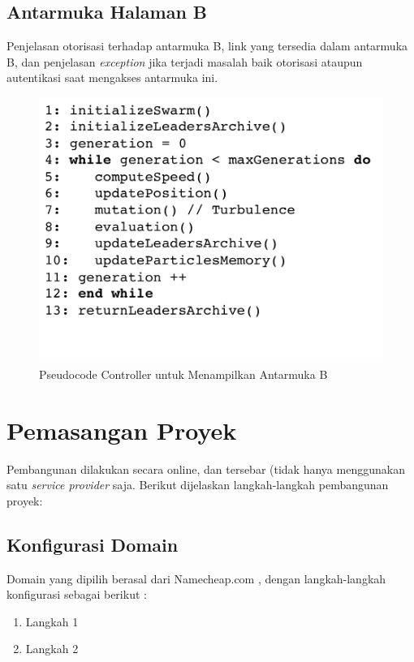     \subsection{Antarmuka Halaman B}
    Penjelasan otorisasi terhadap antarmuka B, link yang tersedia dalam antarmuka B, dan penjelasan \textit{exception} jika terjadi masalah baik otorisasi ataupun autentikasi saat mengakses antarmuka ini.
  
      \begin{figure}[H]
        \centering
        \includegraphics[width=\linewidth]{images/bab4/smpso_code.png}
        \caption{ Pseudocode Controller untuk Menampilkan Antarmuka B }
        \label{pdm}
      \end{figure}
    
    
\section{Pemasangan Proyek}
	Pembangunan dilakukan secara online, dan tersebar (tidak hanya menggunakan satu \textit{service provider} saja.
    Berikut dijelaskan langkah-langkah pembangunan proyek:
    
    \subsection{Konfigurasi Domain}
    Domain yang dipilih berasal dari Namecheap.com , dengan langkah-langkah konfigurasi sebagai berikut :
    \begin{enumerate}
    \item Langkah 1
    \item Langkah 2
    \end{enumerate}
